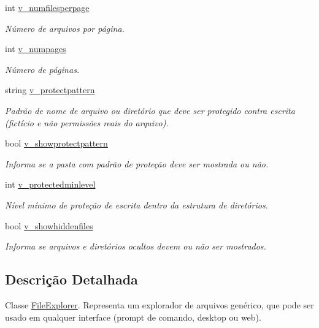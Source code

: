 \begin{DoxyCompactItemize}
int \hyperlink{classSpartacus_1_1Utils_1_1FileExplorer_abbf2deab4665a8be42c23393bdbf54df}{v\+\_\+numfilesperpage}
\begin{DoxyCompactList}\small\item\em Número de arquivos por página. \end{DoxyCompactList}\item 
int \hyperlink{classSpartacus_1_1Utils_1_1FileExplorer_a8017af938b655e57eb51eb83fba48ed6}{v\+\_\+numpages}
\begin{DoxyCompactList}\small\item\em Número de páginas. \end{DoxyCompactList}\item 
string \hyperlink{classSpartacus_1_1Utils_1_1FileExplorer_a1e0f31dd0c66b2a6d5003a0ace555eab}{v\+\_\+protectpattern}
\begin{DoxyCompactList}\small\item\em Padrão de nome de arquivo ou diretório que deve ser protegido contra escrita (fictício e não permissões reais do arquivo). \end{DoxyCompactList}\item 
bool \hyperlink{classSpartacus_1_1Utils_1_1FileExplorer_adba2289bce9aadfdbb353f811fa0411c}{v\+\_\+showprotectpattern}
\begin{DoxyCompactList}\small\item\em Informa se a pasta com padrão de proteção deve ser mostrada ou não. \end{DoxyCompactList}\item 
int \hyperlink{classSpartacus_1_1Utils_1_1FileExplorer_a471c35d5854d9f4dbf605da187f262b1}{v\+\_\+protectedminlevel}
\begin{DoxyCompactList}\small\item\em Nível mínimo de proteção de escrita dentro da estrutura de diretórios. \end{DoxyCompactList}\item 
bool \hyperlink{classSpartacus_1_1Utils_1_1FileExplorer_ac0811882d93d76fb122f8aad7ec7b15d}{v\+\_\+showhiddenfiles}
\begin{DoxyCompactList}\small\item\em Informa se arquivos e diretórios ocultos devem ou não ser mostrados. \end{DoxyCompactList}\end{DoxyCompactItemize}


\subsection{Descrição Detalhada}
Classe \hyperlink{classSpartacus_1_1Utils_1_1FileExplorer}{File\+Explorer}. Representa um explorador de arquivos genérico, que pode ser usado em qualquer interface (prompt de comando, desktop ou web). 



